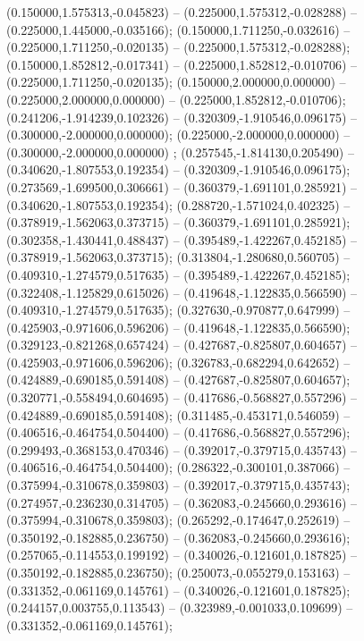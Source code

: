  (0.150000,1.575313,-0.045823) -- (0.225000,1.575312,-0.028288) -- (0.225000,1.445000,-0.035166);
 (0.150000,1.711250,-0.032616) -- (0.225000,1.711250,-0.020135) -- (0.225000,1.575312,-0.028288);
 (0.150000,1.852812,-0.017341) -- (0.225000,1.852812,-0.010706) -- (0.225000,1.711250,-0.020135);
 (0.150000,2.000000,0.000000) -- (0.225000,2.000000,0.000000) -- (0.225000,1.852812,-0.010706);
 (0.241206,-1.914239,0.102326) -- (0.320309,-1.910546,0.096175) -- (0.300000,-2.000000,0.000000);
 (0.225000,-2.000000,0.000000) -- (0.300000,-2.000000,0.000000) ;
 (0.257545,-1.814130,0.205490) -- (0.340620,-1.807553,0.192354) -- (0.320309,-1.910546,0.096175);
 (0.273569,-1.699500,0.306661) -- (0.360379,-1.691101,0.285921) -- (0.340620,-1.807553,0.192354);
 (0.288720,-1.571024,0.402325) -- (0.378919,-1.562063,0.373715) -- (0.360379,-1.691101,0.285921);
 (0.302358,-1.430441,0.488437) -- (0.395489,-1.422267,0.452185) -- (0.378919,-1.562063,0.373715);
 (0.313804,-1.280680,0.560705) -- (0.409310,-1.274579,0.517635) -- (0.395489,-1.422267,0.452185);
 (0.322408,-1.125829,0.615026) -- (0.419648,-1.122835,0.566590) -- (0.409310,-1.274579,0.517635);
 (0.327630,-0.970877,0.647999) -- (0.425903,-0.971606,0.596206) -- (0.419648,-1.122835,0.566590);
 (0.329123,-0.821268,0.657424) -- (0.427687,-0.825807,0.604657) -- (0.425903,-0.971606,0.596206);
 (0.326783,-0.682294,0.642652) -- (0.424889,-0.690185,0.591408) -- (0.427687,-0.825807,0.604657);
 (0.320771,-0.558494,0.604695) -- (0.417686,-0.568827,0.557296) -- (0.424889,-0.690185,0.591408);
 (0.311485,-0.453171,0.546059) -- (0.406516,-0.464754,0.504400) -- (0.417686,-0.568827,0.557296);
 (0.299493,-0.368153,0.470346) -- (0.392017,-0.379715,0.435743) -- (0.406516,-0.464754,0.504400);
 (0.286322,-0.300101,0.387066) -- (0.375994,-0.310678,0.359803) -- (0.392017,-0.379715,0.435743);
 (0.274957,-0.236230,0.314705) -- (0.362083,-0.245660,0.293616) -- (0.375994,-0.310678,0.359803);
 (0.265292,-0.174647,0.252619) -- (0.350192,-0.182885,0.236750) -- (0.362083,-0.245660,0.293616);
 (0.257065,-0.114553,0.199192) -- (0.340026,-0.121601,0.187825) -- (0.350192,-0.182885,0.236750);
 (0.250073,-0.055279,0.153163) -- (0.331352,-0.061169,0.145761) -- (0.340026,-0.121601,0.187825);
 (0.244157,0.003755,0.113543) -- (0.323989,-0.001033,0.109699) -- (0.331352,-0.061169,0.145761);
